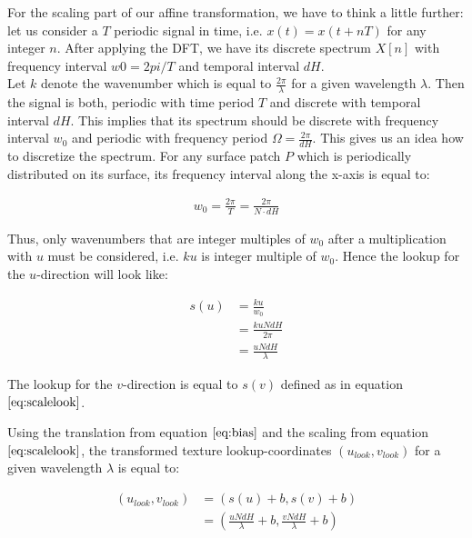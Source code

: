 For the scaling part of our affine transformation, we have to think a little further: let us consider a $T$ periodic signal in time, i.e. $x(t) = x(t+nT)$ for any integer $n$. After applying the DFT, we have its discrete spectrum $X[n]$ with frequency interval $w0 = 2pi / T$ and temporal interval $dH$. \\

Let $k$ denote the wavenumber which is equal to $\frac{2 \pi}{\lambda}$ for a given wavelength $\lambda$. Then the signal is both, periodic with time period $T$ and discrete with temporal interval $dH$. This implies that its spectrum should be discrete with frequency interval $w_0$ and periodic with frequency period $\Omega = \frac{2 \pi}{dH}$. This gives us an idea how to discretize the spectrum. For any surface patch $P$ which is periodically distributed on its surface, its frequency interval along the x-axis is equal to: 

\begin{align}
  w_0 = \frac{2 \pi}{T} = \frac{2 \pi}{N \cdot dH}
\end{align}

Thus, only wavenumbers that are integer multiples of $w_0$ after a multiplication with $u$ must be considered, i.e. $ku$ is integer multiple of $w_0$. Hence the lookup for the $u$-direction will look like:

\begin{align}
    s(u)
    &=\frac{ku}{w_0} \nonumber \\
    &= \frac{ku N dH}{2 \pi} \nonumber \\
    &= \frac{u N dH}{\lambda}
\label{eq:scalelook}
\end{align}

The lookup for the $v$-direction is equal to $s(v)$ defined as in equation $\ref{eq:scalelook}$.

Using the translation from equation $\ref{eq:bias}$ and the scaling from equation $\ref{eq:scalelook}$, the transformed texture lookup-coordinates $(u_{look}, v_{look})$ for a given wavelength $\lambda$ is equal to:

\begin{align}
  (u_{look}, v_{look}) 
  &= \left(s(u)+b,s(v)+b \right) \nonumber \\
  &= \left( \frac{u N dH}{\lambda} + b, \frac{v N dH}{\lambda} + b \right)
\label{eq:ublookup}
\end{align}  

